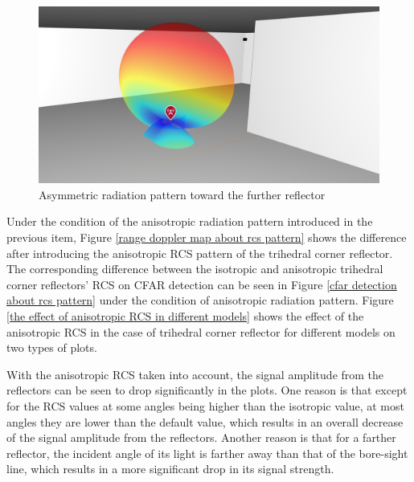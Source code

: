 \documentclass[12pt,DIV14,BCOR12mm,a4paper,footinclude=false,headinclude,parskip=half-,twoside,openright,cleardoublepage=empty,toc=index,bibliography=totoc,listof=totoc]{scrreprt}
\numberwithin{equation}{chapter}
\begin{document}
\begin{figure}
	\centering
	\includegraphics[scale=.25]{figures/asymmetric_antenna.png}
	\caption{Asymmetric radiation pattern toward the further reflector}
	\label{asymmetric radiation pattern toward the further reflector}
\end{figure}

Under the condition of the anisotropic radiation pattern introduced in the previous item, Figure \ref{range doppler map about rcs pattern} shows the difference after introducing the anisotropic RCS pattern of the trihedral corner reflector. The corresponding difference between the isotropic and anisotropic trihedral corner reflectors' RCS on CFAR detection can be seen in Figure \ref{cfar detection about rcs pattern} under the condition of anisotropic radiation pattern. Figure \ref{the effect of anisotropic RCS in different models} shows the effect of the anisotropic RCS in the case of trihedral corner reflector for different models on two types of plots.

With the anisotropic RCS taken into account, the signal amplitude from the reflectors can be seen to drop significantly in the plots. One reason is that except for the RCS values at some angles being higher than the isotropic value, at most angles they are lower than the default value, which results in an overall decrease of the signal amplitude from the reflectors. Another reason is that for a farther reflector, the incident angle of its light is farther away than that of the bore-sight line, which results in a more significant drop in its signal strength.
\end{document}
